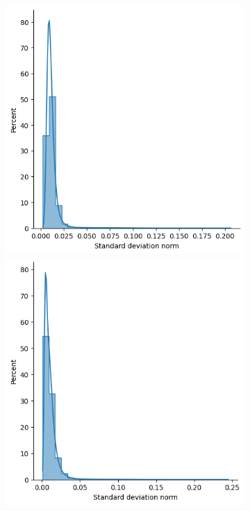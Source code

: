         \begin{figure}[htb]
          \centering
          \begin{subfigure}[t]{\textwidth+20pt\relax}
            \includegraphics[width=\dimexpr\linewidth-20pt\relax]{figures/dropcon/matched_all_std_norms.png}
            \includegraphics[width=\dimexpr\linewidth-20pt\relax]{figures/dropout/matched_all_std_norms.png}

\end{subfigure}
\end{figure}
